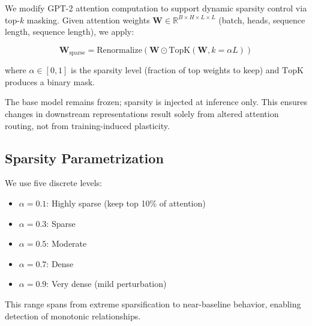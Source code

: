 We modify GPT-2 attention computation to support dynamic sparsity control via top-$k$ masking. Given attention weights $\mathbf{W} \in \mathbb{R}^{B \times H \times L \times L}$ (batch, heads, sequence length, sequence length), we apply:

\begin{equation}
\mathbf{W}_{\text{sparse}} = \text{Renormalize}(\mathbf{W} \odot \text{TopK}(\mathbf{W}, k = \alpha L))
\end{equation}

where $\alpha \in [0, 1]$ is the sparsity level (fraction of top weights to keep) and $\text{TopK}$ produces a binary mask.

The base model remains frozen; sparsity is injected at inference only. This ensures changes in downstream representations result solely from altered attention routing, not from training-induced plasticity.

\subsection*{Sparsity Parametrization}

We use five discrete levels:
\begin{itemize}
    \item $\alpha = 0.1$: Highly sparse (keep top 10\% of attention)
    \item $\alpha = 0.3$: Sparse
    \item $\alpha = 0.5$: Moderate
    \item $\alpha = 0.7$: Dense
    \item $\alpha = 0.9$: Very dense (mild perturbation)
\end{itemize}

This range spans from extreme sparsification to near-baseline behavior, enabling detection of monotonic relationships.
